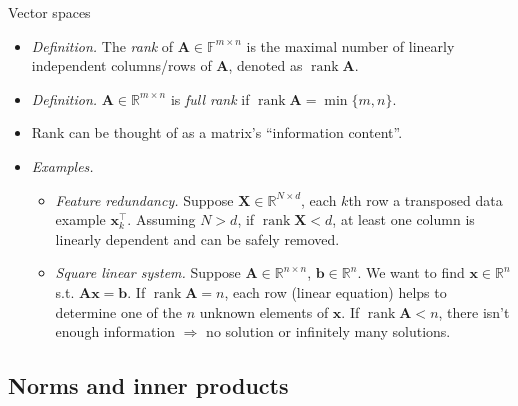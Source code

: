 \documentclass{beamer}
\numberwithin{equation}{section}
\begin{document}
\begin{frame}{Vector spaces}
    \begin{itemize}
        \item
        \textit{Definition.} The \textit{rank} of $ \mathbf{A} \in
        \mathbb{F}^{m \times n} $ is the maximal number of linearly
        independent columns/rows of $ \mathbf{A} $, denoted as
        $ \operatorname{rank}\mathbf{A} $.

        \item
        \textit{Definition.} $ \mathbf{A} \in \mathbb{R}^{m \times n} $ is
        \textit{full rank} if $ \operatorname{rank}\mathbf{A} = \min\{m, n\} $.

        \item
        Rank can be thought of as a matrix's ``information content''.

        \item
        \textit{Examples.}
        \begin{itemize}
            \item
            \textit{Feature redundancy.} Suppose $ \mathbf{X} \in
            \mathbb{R}^{N \times d} $, each $ k $th row a transposed data
            example $ \mathbf{x}_k^\top $. Assuming $ N > d $, if
            $ \operatorname{rank}\mathbf{X} < d $, at least one column is
            linearly dependent and can be safely removed.

            \item
            \textit{Square linear system.} Suppose $ \mathbf{A} \in
            \mathbb{R}^{n \times n} $, $ \mathbf{b} \in \mathbb{R}^n $. We
            want to find $ \mathbf{x} \in \mathbb{R}^n $ s.t. $ \mathbf{Ax} =
            \mathbf{b} $. If $ \operatorname{rank}\mathbf{A} = n $, each row
            (linear equation) helps to determine one of the $ n $ unknown
            elements of $ \mathbf{x} $. If
            $ \operatorname{rank}\mathbf{A} < n $, there isn't enough
            information $ \Rightarrow  $ no solution or infinitely many
            solutions.
        \end{itemize}
    \end{itemize}
\end{frame}

\subsection{Norms and inner products}
\end{document}
